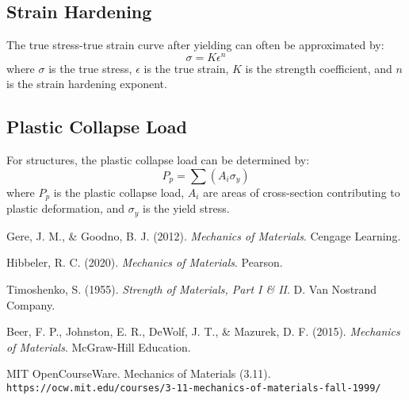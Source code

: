 \documentclass[12pt]{article}
\begin{document}
\subsection{Strain Hardening}
The true stress-true strain curve after yielding can often be approximated by:
\begin{equation}
\sigma = K \epsilon^n
\end{equation}
where $\sigma$ is the true stress, $\epsilon$ is the true strain, $K$ is the strength coefficient, and $n$ is the strain hardening exponent.

\subsection{Plastic Collapse Load}
For structures, the plastic collapse load can be determined by:
\begin{equation}
P_p = \sum (A_i \sigma_y)
\end{equation}
where $P_p$ is the plastic collapse load, $A_i$ are areas of cross-section contributing to plastic deformation, and $\sigma_y$ is the yield stress.

\begin{thebibliography}{9}

Gere, J. M., \& Goodno, B. J. (2012). \textit{Mechanics of Materials}. Cengage Learning.

Hibbeler, R. C. (2020). \textit{Mechanics of Materials}. Pearson.

Timoshenko, S. (1955). \textit{Strength of Materials, Part I \& II}. D. Van Nostrand Company.

Beer, F. P., Johnston, E. R., DeWolf, J. T., \& Mazurek, D. F. (2015). \textit{Mechanics of Materials}. McGraw-Hill Education.

MIT OpenCourseWare. Mechanics of Materials (3.11). 
\\\texttt{https://ocw.mit.edu/courses/3-11-mechanics-of-materials-fall-1999/}

\end{thebibliography}
\end{document}
